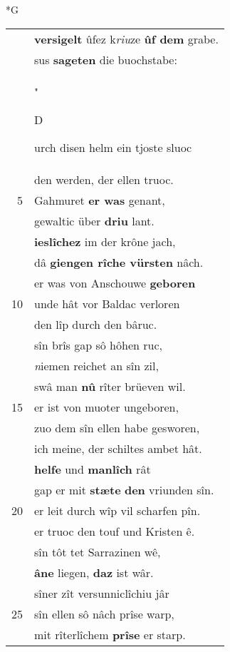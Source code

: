 \documentclass[8pt,a4paper,notitlepage]{article}
\begin{document}
\begin{table}[ht]
\begin{minipage}[t]{0.5\linewidth}
\end{minipage}
\end{table}
\newpage
\begin{table}[ht]
\begin{minipage}[t]{0.5\linewidth}
\small
\begin{center}*G
\end{center}
\begin{tabular}{rl}
 & \textbf{versigelt} ûfez k\textit{riu}ze \textbf{ûf dem} grabe.\\ 
 & sus \textbf{sageten} die buochstabe:\\ 
 & "\begin{large}D\end{large}urch disen helm ein tjoste sluoc\\ 
 & den werden, der ellen truoc.\\ 
5 & Gahmuret \textbf{er was} genant,\\ 
 & gewaltic über \textbf{driu} lant.\\ 
 & \textbf{ieslîchez} im der krône jach,\\ 
 & dâ \textbf{giengen rîche vürsten} nâch.\\ 
 & er was von Anschouwe \textbf{geboren}\\ 
10 & unde hât vor Baldac verloren\\ 
 & den lîp durch den bâruc.\\ 
 & sîn brîs gap sô hôhen ruc,\\ 
 & \textit{n}iemen reichet an sîn zil,\\ 
 & swâ man \textbf{nû} rîter brüeven wil.\\ 
15 & er ist von muoter ungeboren,\\ 
 & zuo dem sîn ellen habe gesworen,\\ 
 & ich meine, der schiltes ambet hât.\\ 
 & \textbf{helfe} und \textbf{manlîch} rât\\ 
 & gap er mit \textbf{stæte} \textbf{den} vriunden sîn.\\ 
20 & er leit durch wîp vil scharfen pîn.\\ 
 & er truoc den touf und Kristen ê.\\ 
 & sîn tôt tet Sarrazinen wê,\\ 
 & \textbf{âne} liegen, \textbf{daz} ist wâr.\\ 
 & sîner zît versunniclîchiu jâr\\ 
25 & sîn ellen sô nâch prîse warp,\\ 
 & mit rîterlîchem \textbf{prîse} er starp.\\ 

\end{tabular}
\end{minipage}
\end{table}
\end{document}
